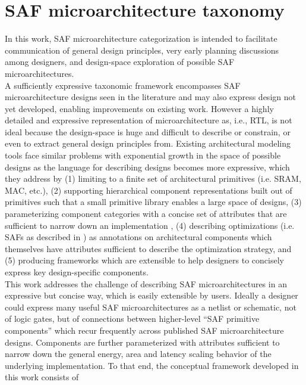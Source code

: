 \chapter{SAF microarchitecture taxonomy}

In this work, SAF microarchitecture categorization is intended to facilitate communication of general design principles, very early planning discussions among designers, and design-space exploration of possible SAF microarchitectures.  \\
%
A sufficiently expressive taxonomic framework encompasses SAF microarchitecture designs seen in the literature and may also express design not yet developed, enabling improvements on existing work. However a highly detailed and expressive representation of microarchitecture as, i.e., RTL, is not ideal because the design-space is huge and difficult to describe or constrain, or even to extract general design principles from. Existing architectural modeling tools face similar problems with exponential growth in the space of possible designs as the language for describing designs becomes more expressive, which they address by (1) limiting to a finite set of architectural primitives (i.e. SRAM, MAC, etc.)\cite{timeloop}, (2) supporting hierarchical component representations built out of primitives \cite{accelergy} such that a small primitive library enables a large space of designs, (3) parameterizing component categories with a concise set of attributes that are sufficient to narrow down an implementation \cite{accelergy}, (4) describing optimizations (i.e. SAFs as described in \cite{sparseloop}) as annotations on architectural components which themselves have attributes sufficient to describe the optimization strategy, and (5) producing frameworks which are extensible to help designers to concisely express key design-specific components.  \\
%
This work addresses the challenge of describing SAF microarchitectures in an expressive but concise way, which is easily extensible by users. Ideally a designer could express many useful SAF microarchitectures as a netlist or schematic, not of logic gates, but of connections between higher-level ``SAF primitive components'' which recur frequently across published SAF microarchitecture designs. Components are further parameterized with attributes sufficient to narrow down the general energy, area and latency scaling behavior of the underlying implementation. To that end, the conceptual framework developed in this work consists of
